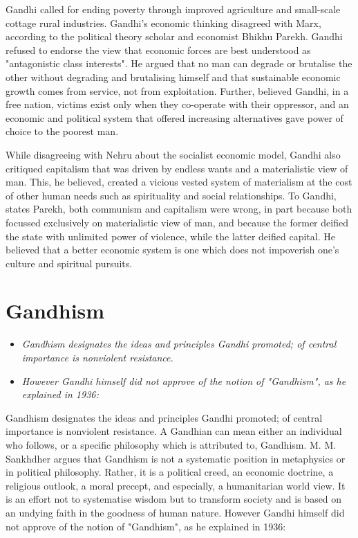 Gandhi called for ending poverty through improved agriculture and
small-scale cottage rural industries. Gandhi's economic thinking
disagreed with Marx, according to the political theory scholar and
economist Bhikhu Parekh. Gandhi refused to endorse the view that
economic forces are best understood as "antagonistic class interests".
He argued that no man can degrade or brutalise the other without
degrading and brutalising himself and that sustainable economic growth
comes from service, not from exploitation. Further, believed Gandhi, in
a free nation, victims exist only when they co-operate with their
oppressor, and an economic and political system that offered increasing
alternatives gave power of choice to the poorest man.

While disagreeing with Nehru about the socialist economic model, Gandhi
also critiqued capitalism that was driven by endless wants and a
materialistic view of man. This, he believed, created a vicious vested
system of materialism at the cost of other human needs such as
spirituality and social relationships. To Gandhi, states Parekh, both
communism and capitalism were wrong, in part because both focussed
exclusively on materialistic view of man, and because the former deified
the state with unlimited power of violence, while the latter deified
capital. He believed that a better economic system is one which does not
impoverish one's culture and spiritual pursuits.

\section{Gandhism}\label{gandhism}

\begin{itemize}
\item
  \emph{Gandhism designates the ideas and principles Gandhi promoted; of
  central importance is nonviolent resistance.}
\item
  \emph{However Gandhi himself did not approve of the notion of
  "Gandhism", as he explained in 1936:}
\end{itemize}

Gandhism designates the ideas and principles Gandhi promoted; of central
importance is nonviolent resistance. A Gandhian can mean either an
individual who follows, or a specific philosophy which is attributed to,
Gandhism. M. M. Sankhdher argues that Gandhism is not a systematic
position in metaphysics or in political philosophy. Rather, it is a
political creed, an economic doctrine, a religious outlook, a moral
precept, and especially, a humanitarian world view. It is an effort not
to systematise wisdom but to transform society and is based on an
undying faith in the goodness of human nature. However Gandhi himself
did not approve of the notion of "Gandhism", as he explained in 1936:

